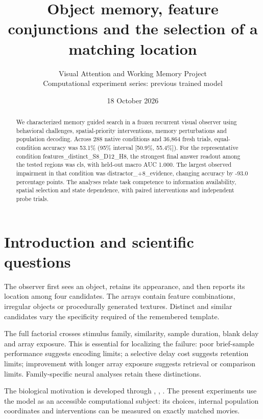 \documentclass[11pt]{article}
\begin{document}
\title{\color{ink}Object memory, feature conjunctions and the selection of a matching location}
\author{Visual Attention and Working Memory Project\\Computational experiment series: previous trained model}\date{18 October 2026}\maketitle
\begin{abstract}
We characterized memory guided search in a frozen recurrent visual observer using behavioral challenges, spatial-priority interventions, memory perturbations and population decoding. Across 288 native conditions and 36,864 fresh trials, equal-condition accuracy was 53.1\% (95\% interval [50.9\%, 55.4\%]). For the representative condition features\_\allowbreak{}distinct\_\allowbreak{}S8\_\allowbreak{}D12\_\allowbreak{}H8, the strongest final answer readout among the tested regions was cls, with held-out macro AUC 1.000. The largest observed impairment in that condition was distractor\_\allowbreak{}+8\_\allowbreak{}evidence, changing accuracy by -93.0 percentage points. The analyses relate task competence to information availability, spatial selection and state dependence, with paired interventions and independent probe trials.
\end{abstract}
\section{Introduction and scientific questions}
The observer first sees an object, retains its appearance, and then reports its location among four candidates. The arrays contain feature combinations, irregular objects or procedurally generated textures. Distinct and similar candidates vary the specificity required of the remembered template.

The full factorial crosses stimulus family, similarity, sample duration, blank delay and array exposure. This is essential for localizing the failure: poor brief-sample performance suggests encoding limits; a selective delay cost suggests retention limits; improvement with longer array exposure suggests retrieval or comparison limits. Family-specific neural analyses retain these distinctions.

The biological motivation is developed through \cite{it}, \cite{treisman}, \cite{wolfe}. The present experiments use the model as an accessible computational subject: its choices, internal population coordinates and interventions can be measured on exactly matched movies.
\end{document}
